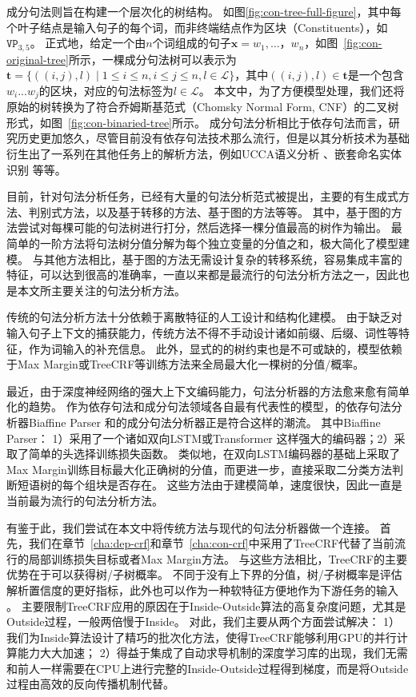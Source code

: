 
成分句法则旨在构建一个层次化的树结构。
如图\ref{fig:con-tree-full-figure}，其中每个叶子结点是输入句子的每个词，而非终端结点作为区块（Constituents），如$\texttt{VP}_{3,5}$。
正式地，给定一个由$n$个词组成的句子$\boldsymbol{x}=w_1,\dots，w_{n}$，如图~\ref{fig:con-original-tree}所示，一棵成分句法树可以表示为$\boldsymbol{t}=\{((i, j),l)\mid 1\le i \le n,i \le j \le n,l \in \mathcal{L}\}$，其中$((i,j),l) \in \boldsymbol{t}$是一个包含$w_{i}...w_{j}$的区块，对应的句法标签为$l \in \mathcal{L}$。
本文中，为了方便模型处理，我们还将原始的树转换为了符合乔姆斯基范式（Chomsky Normal Form, CNF）的二叉树形式，如图~\ref{fig:con-binaried-tree}所示。
成分句法分析相比于依存句法而言，研究历史更加悠久，尽管目前没有依存句法技术那么流行，但是以其分析技术为基础衍生出了一系列在其他任务上的解析方法，例如UCCA语义分析 \citep{jiang-etal-2019-hlt}、嵌套命名实体识别 \citep{fu-etal-2021-nested}等等。

目前，针对句法分析任务，已经有大量的句法分析范式被提出，主要的有生成式方法、判别式方法，以及基于转移的方法、基于图的方法等等。
其中，基于图的方法尝试对每棵可能的句法树进行打分，然后选择一棵分值最高的树作为输出。
最简单的一阶方法将句法树分值分解为每个独立变量的分值之和，极大简化了模型建模。
与其他方法相比，基于图的方法无需设计复杂的转移系统，容易集成丰富的特征，可以达到很高的准确率，一直以来都是最流行的句法分析方法之一，因此也是本文所主要关注的句法分析方法。

传统的句法分析方法十分依赖于离散特征的人工设计和结构化建模。
由于缺乏对输入句子上下文的捕获能力，传统方法不得不手动设计诸如前缀、后缀、词性等特征，作为词输入的补充信息。
此外，显式的的树约束也是不可或缺的，模型依赖于Max Margin或TreeCRF等训练方法来全局最大化一棵树的分值/概率。

最近，由于深度神经网络的强大上下文编码能力，句法分析器的方法愈来愈有简单化的趋势。
作为依存句法和成分句法领域各自最有代表性的模型，\citet{dozat-etal-2017-biaffine}的依存句法分析器Biaffine Parser 和\citet{stern-etal-2017-minimal}的成分句法分析器正是符合这样的潮流。
其中Biaffine Parser： 1）采用了一个诸如双向LSTM或Transformer \citep{vaswani-2017-attention}这样强大的编码器；2）采取了简单的头选择训练损失函数。
类似地，\citet{stern-etal-2017-minimal}在双向LSTM编码器的基础上采取了Max Margin训练目标最大化正确树的分值，而\citet{gaddy-etal-2018-whats}更进一步，直接采取二分类方法判断短语树的每个组块是否存在。
这些方法由于建模简单，速度很快，因此一直是当前最为流行的句法分析方法。

有鉴于此，我们尝试在本文中将传统方法与现代的句法分析器做一个连接。
首先，我们在章节~\ref{cha:dep-crf}和章节~\ref{cha:con-crf}中采用了TreeCRF代替了当前流行的局部训练损失目标或者Max Margin方法。
与这些方法相比，TreeCRF的主要优势在于可以获得树/子树概率。
不同于没有上下界的分值，树/子树概率是评估解析置信度的更好指标，此外也可以作为一种软特征方便地作为下游任务的输入 \citep{zhang-etal-2019-syntax,zhang-etal-2020-syntax}。
主要限制TreeCRF应用的原因在于Inside-Outside算法的高复杂度问题，尤其是Outside过程，一般两倍慢于Inside。
对此，我们主要从两个方面尝试解决：
1）我们为Inside算法设计了精巧的批次化方法，使得TreeCRF能够利用GPU的并行计算能力大大加速；
2）得益于集成了自动求导机制的深度学习库的出现，我们无需和前人一样需要在CPU上进行完整的Inside-Outside过程得到梯度，而是将Outside过程由高效的反向传播机制代替。

